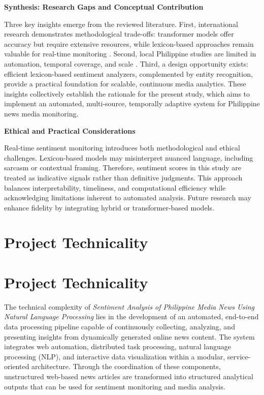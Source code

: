 \textbf{Synthesis: Research Gaps and Conceptual Contribution}

Three key insights emerge from the reviewed literature. First, international research demonstrates methodological trade-offs: transformer models offer accuracy but require extensive resources, while lexicon-based approaches remain valuable for real-time monitoring \cite{ref08,ref10,ref14}. Second, local Philippine studies are limited in automation, temporal coverage, and scale \cite{ref03,ref23,ref25}. Third, a design opportunity exists: efficient lexicon-based sentiment analyzers, complemented by entity recognition, provide a practical foundation for scalable, continuous media analytics. These insights collectively establish the rationale for the present study, which aims to implement an automated, multi-source, temporally adaptive system for Philippine news media monitoring.

\textbf{Ethical and Practical Considerations}

Real-time sentiment monitoring introduces both methodological and ethical challenges. Lexicon-based models may misinterpret nuanced language, including sarcasm or contextual framing. Therefore, sentiment scores in this study are treated as indicative signals rather than definitive judgments. This approach balances interpretability, timeliness, and computational efficiency while acknowledging limitations inherent to automated analysis. Future research may enhance fidelity by integrating hybrid or transformer-based models.

\section{Project Technicality}

\section{Project Technicality}
\label{technicality-of-the-project}

The technical complexity of \emph{Sentiment Analysis of Philippine Media News Using Natural Language Processing} lies in the development of an automated, end-to-end data processing pipeline capable of continuously collecting, analyzing, and presenting insights from dynamically generated online news content. The system integrates web automation, distributed task processing, natural language processing (NLP), and interactive data visualization within a modular, service-oriented architecture. Through the coordination of these components, unstructured web-based news articles are transformed into structured analytical outputs that can be used for sentiment monitoring and media analysis.

